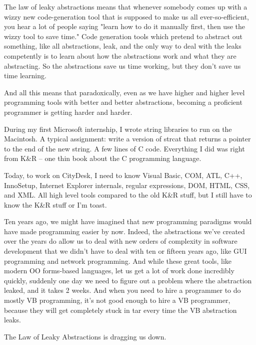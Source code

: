 \documentclass{article}
\begin{document}
The law of leaky abstractions means that whenever somebody comes up with a wizzy new code-generation tool that is supposed to make us all ever-so-efficient, you hear a lot of people saying "learn how to do it manually first, then use the wizzy tool to save time." Code generation tools which pretend to abstract out something, like all abstractions, leak, and the only way to deal with the leaks competently is to learn about how the abstractions work and what they are abstracting. So the abstractions save us time working, but they don't save us time learning.

And all this means that paradoxically, even as we have higher and higher level programming tools with better and better abstractions, becoming a proficient programmer is getting harder and harder.

During my first Microsoft internship, I wrote string libraries to run on the Macintosh. A typical assignment: write a version of strcat that returns a pointer to the end of the new string. A few lines of C code. Everything I did was right from K\&R -- one thin book about the C programming language.

Today, to work on CityDesk, I need to know Visual Basic, COM, ATL, C++, InnoSetup, Internet Explorer internals, regular expressions, DOM, HTML, CSS, and XML. All high level tools compared to the old K\&R stuff, but I still have to know the K\&R stuff or I'm toast.

Ten years ago, we might have imagined that new programming paradigms would have made programming easier by now. Indeed, the abstractions we've created over the years do allow us to deal with new orders of complexity in software development that we didn't have to deal with ten or fifteen years ago, like GUI programming and network programming. And while these great tools, like modern OO forms-based languages, let us get a lot of work done incredibly quickly, suddenly one day we need to figure out a problem where the abstraction leaked, and it takes 2 weeks. And when you need to hire a programmer to do mostly VB programming, it's not good enough to hire a VB programmer, because they will get completely stuck in tar every time the VB abstraction leaks.

The Law of Leaky Abstractions is dragging us down.
\end{document}
